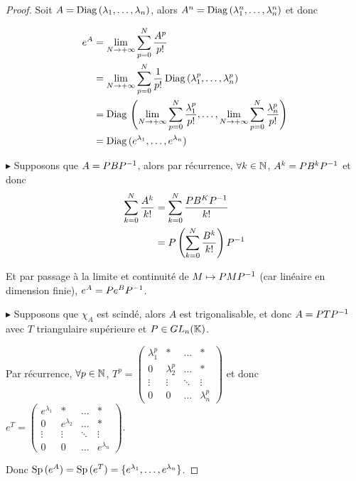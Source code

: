 \begin{proof}
    Soit $A = \operatorname{Diag} \,(\lambda_1, \dots, \lambda_n)$, alors $A^n = \operatorname{Diag} \, (\lambda_1^n, \dots, \lambda_n^n)$ et donc

    \begin{align}
        e^A & = \lim_{N \to + \infty} \sum_{p = 0}^{N} \frac{A^p}{p!} \\
        & = \lim_{N \to + \infty} \sum_{p = 0}^{N} \frac{1}{p!} \operatorname{Diag} \, (\lambda_1^p, \dots, \lambda_n^p) \\
        & = \operatorname{Diag} \, \left( \lim_{N \to + \infty} \sum_{p = 0}^{N} \frac{\lambda_1^p}{p!}, \dots, \lim_{N \to + \infty} \sum_{p = 0}^{N} \frac{\lambda_n^p}{p!} \right) \\
        & = \operatorname{Diag} \, (e^{\lambda_1}, \dots, e^{\lambda_n})
    \end{align}

    \lvspace $\blacktriangleright$ Supposons que $A = PBP^{-1}$, alors par récurrence, 
    $\forall k \in \mathbb{N}$, $A^k = P B^k P^{-1}$ et donc
    \begin{align}
        \sum_{k = 0}^N \frac{A^k}{k!} & = \sum_{k = 0}^{N} \frac{PB^KP^{-1}}{k!} \\
        & = P \left( \sum_{k = 0}^{N} \frac{B^k}{k!} \right) P^{-1}
    \end{align}

    Et par passage à la limite et continuité de $M \mapsto PMP^{-1}$ (car linéaire en 
    dimension finie), $e^A = P e^B P^{-1}$.

    \lvspace $\blacktriangleright$ Supposons que $\chi_A$ est scindé, alors 
    $A$ est trigonalisable, et donc $A = PTP^{-1}$ avec $T$ triangulaire supérieure et $P \in GL_n(\mathbb{K})$.

    Par récurrence, $\forall p \in \mathbb{N}$, $T^p = \begin{pmatrix}
    \lambda_1^p & * & \dots & * \\
    0 & \lambda_2^p & \dots & * \\
    \vdots & \vdots & \ddots & \vdots \\
    0 & 0 & \dots & \lambda_n^p
    \end{pmatrix}$ et donc $e^T = \begin{pmatrix}
    e^{\lambda_1} & * & \dots & * \\
    0 & e^{\lambda_2} & \dots & * \\
    \vdots & \vdots & \ddots & \vdots \\
    0 & 0 & \dots & e^{\lambda_n}
    \end{pmatrix}$.

    Donc $\operatorname{Sp} \,(e^A) = \operatorname{Sp} \,(e^T) = \{e^{\lambda_1}, \dots, e^{\lambda_n}\}$.
\end{proof}

